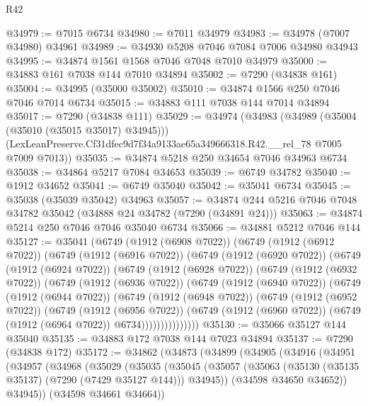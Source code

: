 \begin{lexlean}{R42}
\begin{coremodule}
{@34979 := @7015 @6734
@34980 := @7011 @34979
@34983 := @34978 (@7007 @34980) @34961
@34989 := @34930 @5208 @7046 @7084 @7006 @34980 @34943
@34995 := @34874 @1561 @1568 @7046 @7048 @7010 @34979
@35000 := @34883 @161 @7038 @144 @7010 @34894
@35002 := @7290 (@34838 @161)
@35004 := @34995 (@35000 @35002)
@35010 := @34874 @1566 @250 @7046 @7046 @7014 @6734
@35015 := @34883 @111 @7038 @144 @7014 @34894
@35017 := @7290 (@34838 @111)
@35029 := @34974
    (@34983
      (@34989 (@35004 (@35010 (@35015 @35017) @34945)))
      (LexLeanPreserve.Cf31dfec9d7f34a9133ae65a349666318.R42.__rel_78 @7005 @7009 @7013))
@35035 := @34874 @5218 @250 @34654 @7046 @34963 @6734
@35038 := @34864 @5217 @7084 @34653
@35039 := @6749 @34782
@35040 := @1912 @34652
@35041 := @6749 @35040
@35042 := @35041 @6734
@35045 := @35038 (@35039 @35042) @34963
@35057 := @34874 @244 @5216 @7046 @7048 @34782 @35042 (@34888 @24 @34782 (@7290 (@34891 @24)))
@35063 := @34874 @5214 @250 @7046 @7046 @35040 @6734
@35066 := @34881 @5212 @7046 @144
@35127 := @35041
    (@6749
      (@1912 (@6908 @7022))
      (@6749
        (@1912 (@6912 @7022))
        (@6749
          (@1912 (@6916 @7022))
          (@6749
            (@1912 (@6920 @7022))
            (@6749
              (@1912 (@6924 @7022))
              (@6749
                (@1912 (@6928 @7022))
                (@6749
                  (@1912 (@6932 @7022))
                  (@6749
                    (@1912 (@6936 @7022))
                    (@6749
                      (@1912 (@6940 @7022))
                      (@6749
                        (@1912 (@6944 @7022))
                        (@6749
                          (@1912 (@6948 @7022))
                          (@6749
                            (@1912 (@6952 @7022))
                            (@6749
                              (@1912 (@6956 @7022))
                              (@6749
                                (@1912 (@6960 @7022))
                                (@6749 (@1912 (@6964 @7022)) @6734)))))))))))))))
@35130 := @35066 @35127 @144 @35040
@35135 := @34883 @172 @7038 @144 @7023 @34894
@35137 := @7290 (@34838 @172)
@35172 := @34862
    (@34873
      (@34899
        (@34905
          (@34916
            (@34951
              (@34957
                (@34968
                  (@35029
                    (@35035
                      (@35045
                        (@35057
                          (@35063 (@35130 (@35135 @35137) (@7290 (@7429 @35127 @144))) @34945))
                        (@34598 @34650 @34652))
                      @34945))
                  (@34598 @34661 @34664))
}
\end{coremodule}
\end{lexlean}
